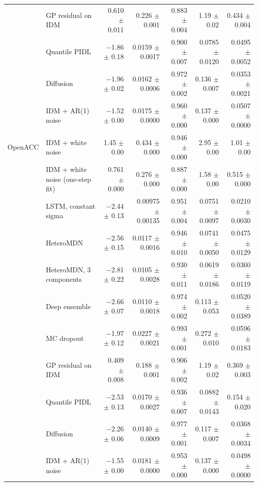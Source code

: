 \begin{longtable}{llrrrrr}
 & GP residual on IDM & 0.610 $\pm$ 0.011 & 0.226 $\pm$ 0.001 & 0.883 $\pm$ 0.004 & 1.19 $\pm$ 0.02 & 0.434 $\pm$ 0.004 \\
 & Quantile PIDL & $-$1.86 $\pm$ 0.18 & 0.0159 $\pm$ 0.0017 & 0.900 $\pm$ 0.007 & 0.0785 $\pm$ 0.0120 & 0.0495 $\pm$ 0.0052 \\
 & Diffusion & $-$1.96 $\pm$ 0.02 & 0.0162 $\pm$ 0.0006 & 0.972 $\pm$ 0.002 & 0.136 $\pm$ 0.007 & 0.0353 $\pm$ 0.0021 \\
 & IDM + AR(1) noise & $-$1.52 $\pm$ 0.00 & 0.0175 $\pm$ 0.0000 & 0.960 $\pm$ 0.000 & 0.137 $\pm$ 0.000 & 0.0507 $\pm$ 0.0000 \\
\midrule
OpenACC & IDM + white noise & 1.45 $\pm$ 0.00 & 0.434 $\pm$ 0.000 & 0.946 $\pm$ 0.000 & 2.95 $\pm$ 0.00 & 1.01 $\pm$ 0.00 \\
 & IDM + white noise (one-step fit) & 0.761 $\pm$ 0.000 & 0.276 $\pm$ 0.000 & 0.887 $\pm$ 0.000 & 1.58 $\pm$ 0.00 & 0.515 $\pm$ 0.000 \\
 & LSTM, constant sigma & $-$2.44 $\pm$ 0.13 & 0.00975 $\pm$ 0.00135 & 0.951 $\pm$ 0.004 & 0.0751 $\pm$ 0.0097 & 0.0210 $\pm$ 0.0030 \\
 & HeteroMDN & $-$2.56 $\pm$ 0.15 & 0.0117 $\pm$ 0.0016 & 0.946 $\pm$ 0.010 & 0.0741 $\pm$ 0.0050 & 0.0475 $\pm$ 0.0129 \\
 & HeteroMDN, 3 components & $-$2.81 $\pm$ 0.22 & 0.0105 $\pm$ 0.0028 & 0.930 $\pm$ 0.011 & 0.0619 $\pm$ 0.0186 & 0.0360 $\pm$ 0.0119 \\
 & Deep ensemble & $-$2.66 $\pm$ 0.07 & 0.0110 $\pm$ 0.0018 & 0.974 $\pm$ 0.002 & 0.113 $\pm$ 0.053 & 0.0520 $\pm$ 0.0389 \\
 & MC dropout & $-$1.97 $\pm$ 0.12 & 0.0227 $\pm$ 0.0021 & 0.993 $\pm$ 0.001 & 0.272 $\pm$ 0.010 & 0.0596 $\pm$ 0.0183 \\
 & GP residual on IDM & 0.409 $\pm$ 0.008 & 0.188 $\pm$ 0.001 & 0.906 $\pm$ 0.002 & 1.19 $\pm$ 0.02 & 0.369 $\pm$ 0.003 \\
 & Quantile PIDL & $-$2.53 $\pm$ 0.13 & 0.0170 $\pm$ 0.0027 & 0.936 $\pm$ 0.007 & 0.0882 $\pm$ 0.0143 & 0.154 $\pm$ 0.020 \\
 & Diffusion & $-$2.26 $\pm$ 0.06 & 0.0140 $\pm$ 0.0009 & 0.977 $\pm$ 0.001 & 0.117 $\pm$ 0.007 & 0.0368 $\pm$ 0.0034 \\
 & IDM + AR(1) noise & $-$1.55 $\pm$ 0.00 & 0.0181 $\pm$ 0.0000 & 0.953 $\pm$ 0.000 & 0.137 $\pm$ 0.000 & 0.0498 $\pm$ 0.0000 \\
\end{longtable}
\endgroup
